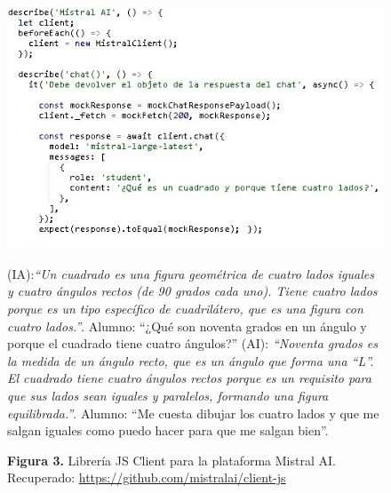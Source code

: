\documentclass{article}
\begin{document}
\begin{figure}[htbp]
	\begin{minipage}[c]{0.60\textwidth}
		\includegraphics[width=\textwidth,height=0.285\textheight]{ia.jpg}
	\end{minipage}
	\hspace{1mm}
	\begin{minipage}[c]{0.40\textwidth}
		\raggedright
		\begin{justify}
			\begin{spacing}{0.5} %
				\fontsize{9}{10}\selectfont %
				(IA):\textit{“Un cuadrado es una figura geométrica de cuatro lados iguales y cuatro ángulos rectos (de 90 grados cada uno). Tiene cuatro lados porque es un tipo específico de cuadrilátero, que es una figura con cuatro lados.”}. Alumno: “¿Qué son noventa grados en un ángulo y porque el cuadrado tiene cuatro ángulos?” (AI): \textit{“Noventa grados es la medida de un ángulo recto, que es un ángulo que forma una “L”. El cuadrado tiene cuatro ángulos rectos porque es un requisito para que sus lados sean iguales y paralelos, formando una figura equilibrada.”}. Alumno: “Me cuesta dibujar los cuatro lados y que me salgan iguales como puedo hacer para que me salgan bien”.
			\end{spacing}
		\end{justify}
	\end{minipage}
	\label{fig:IA}
	\vspace{0.5em} %

	\begin{center}
			\vspace{-0.35cm}
			\changefontsizes{8.8pt}\textbf{Figura 3.} Librería JS Client para la plataforma Mistral AI. Recuperado: \url{https://github.com/mistralai/client-js}
	\end{center}
\end{figure}
\end{document}
